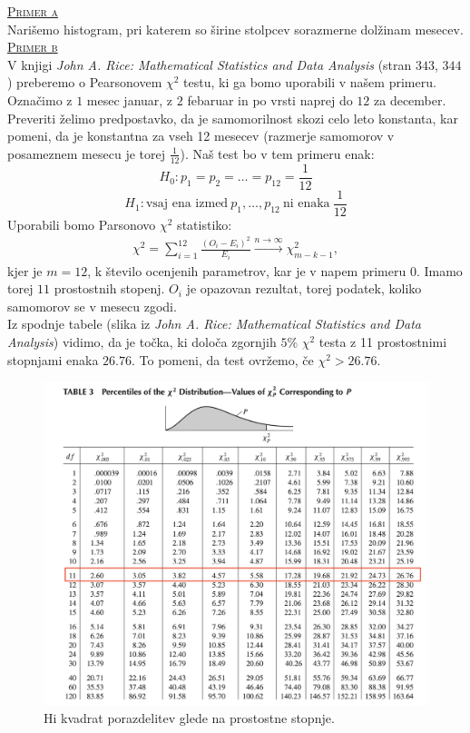 \documentclass[a4paper,12pt]{article}
\begin{document}
\noindent
\textsc{\underline{Primer a}}
\\
Narišemo histogram, pri katerem so širine stolpcev sorazmerne dolžinam mesecev. 
\\
\noindent
\textsc{\underline{Primer b}}
\\
V knjigi \textit{John A. Rice: Mathematical Statistics and Data Analysis} (stran $343$, $344$) preberemo o Pearsonovem $\chi^2$ testu, ki ga bomo uporabili v našem primeru.
\\
Označimo z $1$ mesec januar, z $2$ febaruar in po vrsti naprej do $12$ za december. 
\\
Preveriti želimo predpostavko, da je samomorilnost skozi celo leto konstanta, kar pomeni, da je konstantna za vseh 12 mesecev (razmerje samomorov v posameznem mesecu je torej $\frac{1}{12}$). Naš test bo v tem primeru enak:
$$ H_0 : p_1 = p_2 = \ldots = p_{12} = \frac{1}{12} $$
$$ H_1 : \text{vsaj ena izmed} \  p_1, \ldots, p_{12} \ \text{ni enaka} \ \frac{1}{12} $$
Uporabili bomo Parsonovo $\chi^2$ statistiko:
\begin{align}\label{en:hi}
    \chi^2 = \sum_{i = 1}^{12} \frac{(O_i - E_i)^2}{E_i} \xrightarrow{n \rightarrow \infty} \chi_{m - k - 1}^2, 
\end{align}
kjer je $m = 12$, k število ocenjenih parametrov, kar je v napem primeru $0$. Imamo torej $11$ prostostnih stopenj. $O_i$ je opazovan rezultat, torej podatek, koliko samomorov se v mesecu zgodi.
\\
Iz spodnje tabele (slika iz \textit{John A. Rice: Mathematical Statistics and Data Analysis}) vidimo, da je točka, ki določa zgornjih $5\%$ $\chi^2$ testa z 11 prostostnimi stopnjami enaka $26.76$. To pomeni, da test ovržemo, če $\chi^2 > 26.76$. 
\begin{figure}[ht!]
    \centering
    \includegraphics[width=130mm]{hi.png}
    \caption{Hi kvadrat porazdelitev glede na prostostne stopnje.}
\end{figure}
\end{document}
